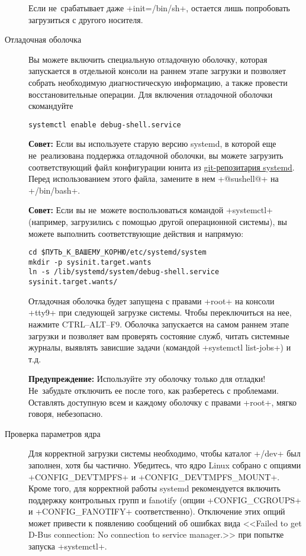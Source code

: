 \documentclass[10pt,oneside,a4paper]{article}
\begin{document}
\begin{description}
	Если не~срабатывает даже +init=/bin/sh+, остается лишь попробовать
	загрузиться с другого носителя.

\item[Отладочная оболочка]\hypertarget{it:dbgshell}{}
	Вы можете включить специальную отладочную оболочку, которая запускается
	в отдельной консоли на раннем этапе загрузки и позволяет собрать
	необходимую диагностическую информацию, а также провести
	восстановительные операции. Для включения отладочной оболочки
	скомандуйте
\begin{Verbatim}
systemctl enable debug-shell.service
\end{Verbatim}
	
	\textbf{Совет:} Если вы используете старую версию systemd, в которой еще
	не~реализована поддержка отладочной оболочки, вы можете загрузить
	соответствующий файл конфигурации юнита из
	\href{http://cgit.freedesktop.org/systemd/systemd/plain/units/debug-shell.service.in}{git-репозитария
	systemd}. Перед использованием этого файла, замените в нем +@sushell@+
	на +/bin/bash+.

	\textbf{Совет:} Если вы не~можете воспользоваться командой +systemctl+
	(например, загрузились с помощью другой операционной системы), вы можете
	выполнить соответствующие действия и напрямую:
\begin{Verbatim}
cd $ПУТЬ_К_ВАШЕМУ_КОРНЮ/etc/systemd/system
mkdir -p sysinit.target.wants
ln -s /lib/systemd/system/debug-shell.service sysinit.target.wants/
\end{Verbatim}
	
	Отладочная оболочка будет запущена с правами +root+ на консоли +tty9+
	при следующей загрузке системы. Чтобы переключиться на нее, нажмите
	CTRL--ALT--F9. Оболочка запускается на самом раннем этапе загрузки и
	позволяет вам проверять состояние служб, читать системные журналы,
	выявлять зависшие задачи (командой +systemctl list-jobs+) и т.д.

	\textbf{Предупреждение:} Используйте эту оболочку только для отладки!
	Не~забудьте отключить ее после того, как разберетесь с проблемами.
	Оставлять доступную всем и каждому оболочку с правами +root+, мягко
	говоря, небезопасно.

\item[Проверка параметров ядра] Для корректной загрузки системы необходимо,
	чтобы каталог +/dev+ был заполнен, хотя бы частично. Убедитесь, что ядро
	Linux собрано с опциями +CONFIG_DEVTMPFS+ и +CONFIG_DEVTMPFS_MOUNT+.
	Кроме того, для корректной работы systemd рекомендуется включить
	поддержку контрольных групп и fanotify (опции +CONFIG_CGROUPS+ и 
	+CONFIG_FANOTIFY+ соответственно). Отключение этих опций может привести
	к появлению сообщений об ошибках вида <<Failed to get D-Bus
	connection: No connection to service manager.>> при попытке запуска
	+systemctl+.
\end{description}
\end{document}
